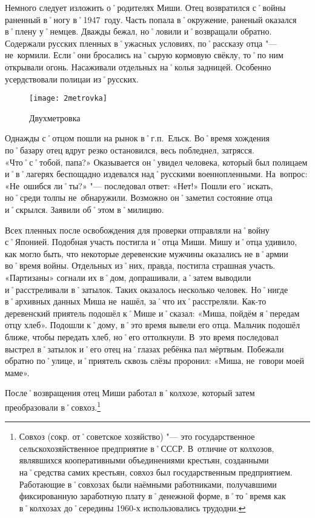 Немного следует изложить о˚родителях Миши. Отец возвратился с˚войны раненный в˚ногу в˚1947~году. Часть попала в˚окружение, раненый оказался в˚плену у˚немцев. Дважды бежал, но˚ловили и˚возвращали обратно. Содержали русских пленных в˚ужасных условиях, по˚рассказу отца "--- не~кормили. Если˚они бросались на˚сырую кормовую свёклу, то˚по ним открывали огонь. Насаживали отдельных на˚колья задницей. Особенно усердствовали полицаи из˚русских. 

\begin{wrapfigure}{O}{.25\textwidth}
\centering
\texttt{[image: 2metrovka]}
\caption[Двухметровка]{Двухметровка\footnotemark}
\label{fig:2metrovka}
\end{wrapfigure}

Однажды с˚отцом пошли на рынок в˚г.п.~Ельск. Во˚время хождения по˚базару отец вдруг резко остановился, весь побледнел, затрясся. «Что˚с˚тобой, папа?» Оказывается он˚увидел человека, который был полицаем и˚в˚лагерях беспощадно издевался над˚русскими военнопленными. На~вопрос: «Не~ошибся ли˚ты?» "--- последовал ответ: «Нет!» Пошли его˚искать, но˚среди толпы не~обнаружили. Возможно он˚заметил состояние отца и˚скрылся. Заявили об˚этом в˚милицию.

Всех пленных после освобождения для проверки отправляли на˚войну с˚Японией. Подобная участь постигла и˚отца Миши. Мишу и˚отца удивило, как могло быть, что некоторые деревенские мужчины оказались не в˚армии во˚время войны. Отдельных из˚них, правда, постигла страшная участь. «Партизаны» согнали их в˚дом, допрашивали, а˚затем выводили и˚расстреливали в˚затылок. Таких оказалось несколько человек. Но˚нигде в˚архивных данных Миша не~нашёл, за˚что их˚расстреляли. Как-то деревенский приятель подошёл к˚Мише и˚сказал: «Миша, пойдём я˚передам отцу хлеб». Подошли к˚дому, в˚это время вывели его отца. Мальчик подошёл ближе, чтобы передать хлеб, но˚его оттолкнули. В~это время последовал выстрел в˚затылок и˚его отец на˚глазах ребёнка пал мёртвым. Побежали обратно по˚улице, и˚приятель сквозь слёзы проронил: «Миша, не~говори моей маме».

После˚возвращения отец Миши работал в˚колхозе, который затем преобразовали в˚совхоз.\footnote{Совхоз (сокр. от˚советское хозяйство) "--- это государственное сельскохозяйственное предприятие в˚СССР. В~отличие от колхозов, являвшихся кооперативными объединениями крестьян, созданными на˚средства самих крестьян, совхоз был государственным предприятием. Работающие в˚совхозах были наёмными работниками, получавшими фиксированную заработную плату в˚денежной форме, в˚то˚время как в˚колхозах до˚середины 1960-х использовались трудодни.}

